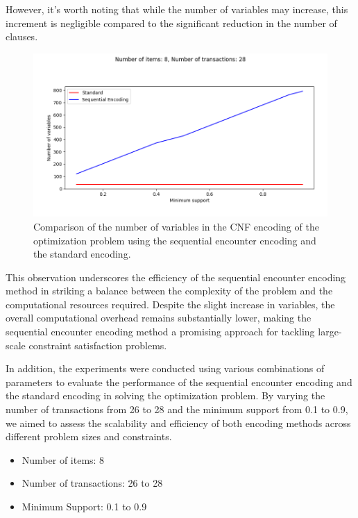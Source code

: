 However, it's worth noting that while the number of variables may increase, this increment is negligible compared to the significant reduction in the number of clauses.
\begin{figure}[H]
    \centering
    \includegraphics[width=1\textwidth]{chapter4/image/n_trans_28_vars.png}
    \caption{Comparison of the number of variables in the CNF encoding of the optimization problem using the sequential encounter encoding and the standard encoding.}
    \label{fig:4_3}
\end{figure}

This observation underscores the efficiency of the sequential encounter encoding method in striking a balance between the complexity of the problem and the computational resources required.
Despite the slight increase in variables, the overall computational overhead remains substantially lower,
making the sequential encounter encoding method a promising approach for tackling large-scale constraint satisfaction problems.

In addition, the experiments were conducted using various combinations of parameters to evaluate the performance of the sequential encounter encoding and the standard encoding in solving the optimization problem. By varying the number of transactions from 26 to 28 and the minimum support from 0.1 to 0.9, we aimed to assess the scalability and efficiency of both encoding methods across different problem sizes and constraints.
\begin{itemize}
    \item Number of items: 8
    \item Number of transactions: 26 to 28
    \item Minimum Support: 0.1 to 0.9
\end{itemize}

